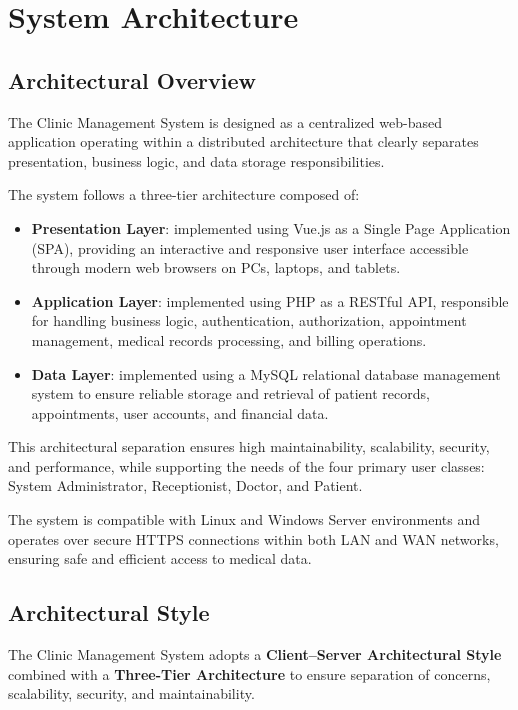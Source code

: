 \section{System Architecture}

\subsection{Architectural Overview}
The Clinic Management System is designed as a centralized web-based application operating within a distributed architecture that clearly separates presentation, business logic, and data storage responsibilities.

The system follows a three-tier architecture composed of:

\begin{itemize}
	\item \textbf{Presentation Layer}: implemented using Vue.js as a Single Page Application (SPA), providing an interactive and responsive user interface accessible through modern web browsers on PCs, laptops, and tablets.
	\item \textbf{Application Layer}: implemented using PHP as a RESTful API, responsible for handling business logic, authentication, authorization, appointment management, medical records processing, and billing operations.
	\item \textbf{Data Layer}: implemented using a MySQL relational database management system to ensure reliable storage and retrieval of patient records, appointments, user accounts, and financial data.
\end{itemize}

This architectural separation ensures high maintainability, scalability, security, and performance, while supporting the needs of the four primary user classes: System Administrator, Receptionist, Doctor, and Patient.

The system is compatible with Linux and Windows Server environments and operates over secure HTTPS connections within both LAN and WAN networks, ensuring safe and efficient access to medical data.

\subsection{Architectural Style}
The Clinic Management System adopts a \textbf{Client–Server Architectural Style} combined with a \textbf{Three-Tier Architecture} to ensure separation of concerns, scalability, security, and maintainability.

